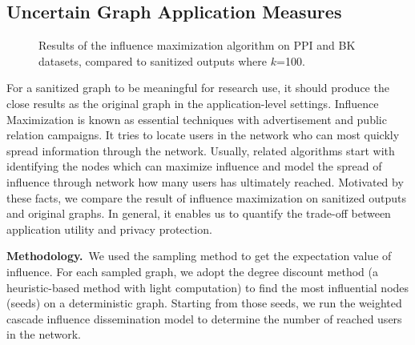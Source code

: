 \subsection{Uncertain Graph Application Measures}
\begin{figure}[!htb]
    \centering
    \caption{ Results of the influence maximization algorithm on PPI and BK datasets, compared to sanitized outputs where $k$=100.}
    \vspace{-15pt}
    \label{fig:IM}
\end{figure} 
For a sanitized graph to be meaningful for research use, it should produce 
the close results as the original graph in the application-level settings. 
Influence Maximization is known as essential techniques with advertisement and public relation campaigns.
It tries to locate users in the network who can most quickly spread information through the network. 
Usually, related algorithms start with identifying the nodes which can maximize influence and model the spread of influence through network how many users has ultimately reached.  
Motivated by these facts, we compare the result of influence maximization on sanitized outputs and original graphs. 
In general, it enables us to quantify the trade-off between application utility and privacy protection. 

\textbf{Methodology.}~We used the sampling method to get the expectation value of influence. For each sampled graph, we adopt the degree discount method (a heuristic-based method with light computation) to find the most influential nodes (seeds) on a deterministic graph. Starting from those seeds, we run the weighted cascade influence dissemination model to determine the number of reached users in the network. 

